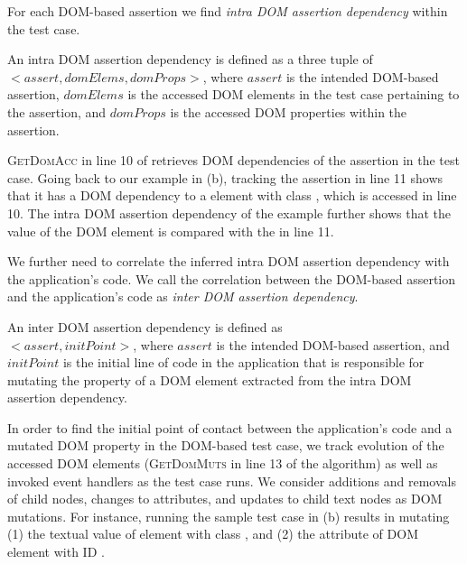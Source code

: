 For each DOM-based assertion we find \emph{intra DOM assertion dependency} within the test case.
\begin{mydef}
\label{def:intraDOMDep}  
An intra DOM assertion dependency is defined as a three tuple of $<assert, domElems, domProps>$, where $assert$ is the intended DOM-based assertion, $domElems$ is the accessed DOM elements in the test case pertaining to the assertion, and $domProps$ is the accessed DOM properties within the assertion.
\end{mydef}
\textsc{GetDomAcc} in line 10 of  retrieves DOM dependencies of the assertion in the test case.
Going back to our example in (b), tracking the assertion in line 11 shows that it has a DOM dependency to a  element with class , which is accessed in line 10. The intra DOM assertion dependency of the example further shows that the  value of the DOM element is compared with the  in line 11.    

We further need to correlate the inferred intra DOM assertion dependency with the application's code.
We call the correlation between the DOM-based assertion and the application's code as \emph{inter DOM assertion dependency}.
\begin{mydef}
\label{def:interDOMDep}  
An inter DOM assertion dependency is defined as\\
$<assert, initPoint>$, where $assert$ is the intended DOM-based assertion, and $initPoint$ is the initial line of code in the application that is responsible for mutating the property of a DOM element extracted from the intra DOM assertion dependency.
\end{mydef}
In order to find the initial point of contact between the application's code and a mutated DOM property in the DOM-based test case, we track evolution of the accessed DOM elements (\textsc{GetDomMuts} in line 13 of the algorithm) as well as invoked event handlers as the test case runs. 
We consider additions and removals of child nodes, changes to attributes, and updates to child text nodes as DOM mutations. For instance, running the sample test case in (b) results in mutating (1) the textual value of  element with class , and (2) the  attribute of DOM element with ID .

